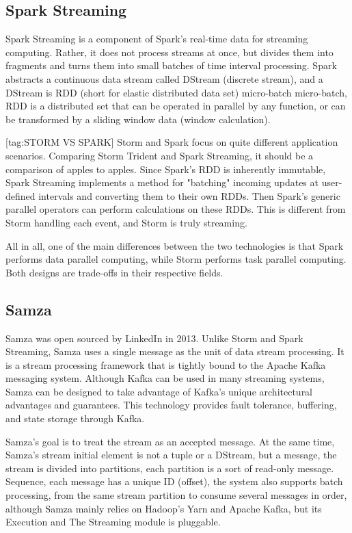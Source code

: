 \documentclass[journal]{IEEEtran}
\begin{document}
\subsection{Spark Streaming}

Spark Streaming is a component of Spark's real-time data for streaming computing. Rather, it does not process streams at once, but divides them into fragments and turns them into small batches of time interval processing. Spark abstracts a continuous data stream called DStream (discrete stream), and a DStream is RDD (short for elastic distributed data set) micro-batch micro-batch, RDD is a distributed set that can be operated in parallel by any function, or can be transformed by a sliding window data (window calculation).

[tag:STORM VS SPARK]
Storm and Spark focus on quite different application scenarios. Comparing Storm Trident and Spark Streaming, it should be a comparison of apples to apples. Since Spark's RDD is inherently immutable, Spark Streaming implements a method for "batching" incoming updates at user-defined intervals and converting them to their own RDDs. Then Spark's generic parallel operators can perform calculations on these RDDs. This is different from Storm handling each event, and Storm is truly streaming.

All in all, one of the main differences between the two technologies is that Spark performs data parallel computing, while Storm performs task parallel computing. Both designs are trade-offs in their respective fields.


\subsection{Samza}

Samza was open sourced by LinkedIn in 2013. Unlike Storm and Spark Streaming, Samza uses a single message as the unit of data stream processing. It is a stream processing framework that is tightly bound to the Apache Kafka messaging system. Although Kafka can be used in many streaming systems, Samza can be designed to take advantage of Kafka's unique architectural advantages and guarantees. This technology provides fault tolerance, buffering, and state storage through Kafka.

Samza's goal is to treat the stream as an accepted message. At the same time, Samza's stream initial element is not a tuple or a DStream, but a message, the stream is divided into partitions, each partition is a sort of read-only message. Sequence, each message has a unique ID (offset), the system also supports batch processing, from the same stream partition to consume several messages in order, although Samza mainly relies on Hadoop's Yarn and Apache Kafka, but its Execution and The Streaming module is pluggable.
\end{document}
